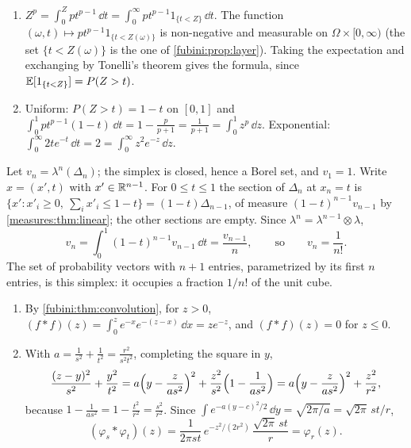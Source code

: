 \begin{enumerate}[nosep]
  \item $Z^p = \int_0^Zpt^{p-1}\,\dd t
        = \int_0^\infty pt^{p-1}1_{\{t < Z\}}\,\dd t$. The function
        $(\omega, t)\mapsto pt^{p-1}1_{\{t < Z(\omega)\}}$ is
        non-negative and measurable on $\Omega\times[0, \infty)$ (the
        set $\{t < Z(\omega)\}$ is the one of
        \cref{fubini:prop:layer}). Taking the expectation and
        exchanging by Tonelli's theorem gives the formula, since
        $\mathbb{E}[1_{\{t < Z\}}] = P(Z > t)$.
  \item Uniform: $P(Z > t) = 1 - t$ on $[0, 1]$ and
        $\int_0^1pt^{p-1}(1 - t)\,\dd t = 1 - \frac p{p+1}
        = \frac1{p+1} = \int_0^1z^p\,\dd z$. Exponential:
        $\int_0^\infty2te^{-t}\,\dd t = 2 = \int_0^\infty z^2e^{-z}\,\dd z$.
\end{enumerate}

Let $v_n = \lambda^n(\Delta_n)$; the simplex is closed, hence a Borel
set, and $v_1 = 1$. Write $x = (x', t)$ with $x'\in\mathbb{R}^{n-1}$. For
$0\leq t\leq1$ the section of $\Delta_n$ at $x_n = t$ is
$\{x' : x'_i\geq0,\ \sum_ix'_i\leq1 - t\} = (1 - t)\Delta_{n-1}$, of
measure $(1 - t)^{n-1}v_{n-1}$ by \cref{measures:thm:linear}; the other
sections are empty. Since $\lambda^n = \lambda^{n-1}\otimes\lambda$,
\[
  v_n = \int_0^1(1 - t)^{n-1}v_{n-1}\,\dd t = \frac{v_{n-1}}n ,
  \qquad\text{so}\qquad v_n = \frac1{n!} .
\]
The set of probability vectors with $n + 1$ entries, parametrized by its
first $n$ entries, is this simplex: it occupies a fraction $1/n!$ of the
unit cube.

\begin{enumerate}[nosep]
  \item By \cref{fubini:thm:convolution}, for $z > 0$,
        $(f*f)(z) = \int_0^ze^{-x}e^{-(z - x)}\,\dd x = ze^{-z}$, and
        $(f*f)(z) = 0$ for $z\leq0$.
  \item With $a = \frac1{s^2} + \frac1{t^2} = \frac{r^2}{s^2t^2}$,
        completing the square in $y$,
        \[
          \frac{(z - y)^2}{s^2} + \frac{y^2}{t^2}
          = a\Bigl(y - \frac z{as^2}\Bigr)^2
            + \frac{z^2}{s^2}\Bigl(1 - \frac1{as^2}\Bigr)
          = a\Bigl(y - \frac z{as^2}\Bigr)^2 + \frac{z^2}{r^2} ,
        \]
        because $1 - \frac1{as^2} = 1 - \frac{t^2}{r^2}
        = \frac{s^2}{r^2}$. Since
        $\int e^{-a(y - c)^2/2}\,\dd y = \sqrt{2\pi/a}
        = \sqrt{2\pi}\,st/r$,
        \[
          (\varphi_s*\varphi_t)(z)
          = \frac1{2\pi st}\,e^{-z^2/(2r^2)}\,\frac{\sqrt{2\pi}\,st}r
          = \varphi_r(z) .
        \]
\end{enumerate}

